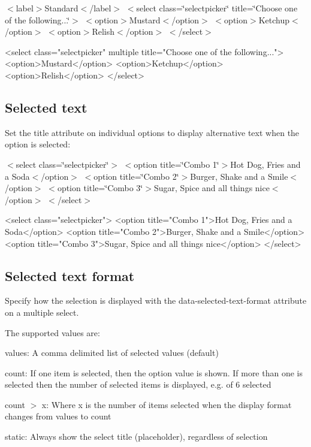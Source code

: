   $<$label$>$Standard$<$/label$>$ $<$select class=\char`\"{}selectpicker\char`\"{} title=\char`\"{}\+Choose one of the following...\char`\"{}$>$ $<$option$>$Mustard$<$/option$>$ $<$option$>$Ketchup$<$/option$>$ $<$option$>$Relish$<$/option$>$ $<$/select$>$  


\begin{DoxyCode}
<select class="selectpicker" multiple title="Choose one of the following...">
  <option>Mustard</option>
  <option>Ketchup</option>
  <option>Relish</option>
</select>
\end{DoxyCode}


\subsection*{Selected text}

Set the {\ttfamily title} attribute on individual options to display alternative text when the option is selected\+:

 $<$select class=\char`\"{}selectpicker\char`\"{}$>$ $<$option title=\char`\"{}\+Combo 1\char`\"{}$>$Hot Dog, Fries and a Soda$<$/option$>$ $<$option title=\char`\"{}\+Combo 2\char`\"{}$>$Burger, Shake and a Smile$<$/option$>$ $<$option title=\char`\"{}\+Combo 3\char`\"{}$>$Sugar, Spice and all things nice$<$/option$>$ $<$/select$>$ 


\begin{DoxyCode}
<select class="selectpicker">
  <option title="Combo 1">Hot Dog, Fries and a Soda</option>
  <option title="Combo 2">Burger, Shake and a Smile</option>
  <option title="Combo 3">Sugar, Spice and all things nice</option>
</select>
\end{DoxyCode}
 \subsection*{Selected text format}

Specify how the selection is displayed with the {\ttfamily data-\/selected-\/text-\/format} attribute on a multiple select.

The supported values are\+:


\begin{DoxyItemize}
\item {\ttfamily values}\+: A comma delimited list of selected values (default)
\item {\ttfamily count}\+: If one item is selected, then the option value is shown. If more than one is selected then the number of selected items is displayed, e.\+g. { of 6 selected}
\item {\ttfamily count $>$ x}\+: Where {\ttfamily x} is the number of items selected when the display format changes from {\ttfamily values} to {\ttfamily count}
\item {\ttfamily static}\+: Always show the select title (placeholder), regardless of selection
\end{DoxyItemize}

